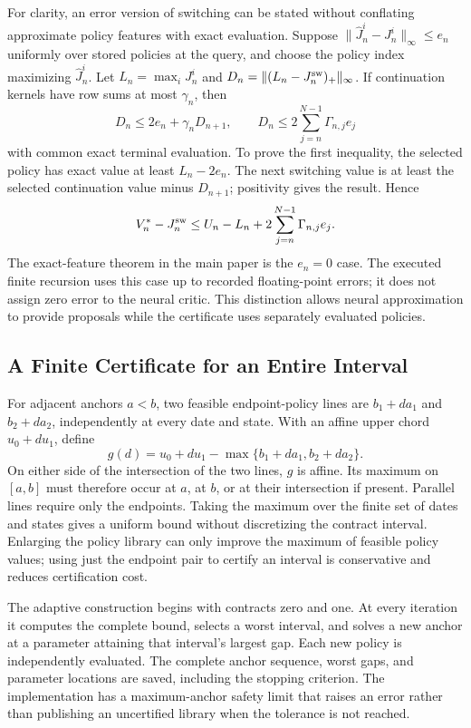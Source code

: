 For clarity, an error version of switching can be stated without conflating approximate policy features with exact evaluation. Suppose $\|\widehat J^i_n-J^i_n\|_\infty\leq e_n$ uniformly over stored policies at the query, and choose the policy index maximizing $\widehat J^i_n$. Let $L_n=\max_iJ^i_n$ and $D_n=\|(L_n-J_n^{\rm sw})_+\|_\infty$. If continuation kernels have row sums at most $\gamma_n$, then
\begin{equation}
 D_n\leq 2e_n+\gamma_nD_{n+1},\qquad
 D_n\leq2\sum_{j=n}^{N-1}\Gamma_{n,j}e_j
 \label{eq:supp_switch_error}
\end{equation}
with common exact terminal evaluation. To prove the first inequality, the selected policy has exact value at least $L_n-2e_n$. The next switching value is at least the selected continuation value minus $D_{n+1}$; positivity gives the result. Hence
\[
 V_n^*-J_n^{\rm sw}\leq U_n-L_n+
 2\sum_{j=n}^{N-1}\Gamma_{n,j}e_j.
\]
The exact-feature theorem in the main paper is the $e_n=0$ case. The executed finite recursion uses this case up to recorded floating-point errors; it does not assign zero error to the neural critic. This distinction allows neural approximation to provide proposals while the certificate uses separately evaluated policies.

\subsection{A Finite Certificate for an Entire Interval}
For adjacent anchors $a<b$, two feasible endpoint-policy lines are $b_1+d a_1$ and $b_2+d a_2$, independently at every date and state. With an affine upper chord $u_0+d u_1$, define
\[
 g(d)=u_0+d u_1-\max\{b_1+d a_1,b_2+d a_2\}.
\]
On either side of the intersection of the two lines, $g$ is affine. Its maximum on $[a,b]$ must therefore occur at $a$, at $b$, or at their intersection if present. Parallel lines require only the endpoints. Taking the maximum over the finite set of dates and states gives a uniform bound without discretizing the contract interval. Enlarging the policy library can only improve the maximum of feasible policy values; using just the endpoint pair to certify an interval is conservative and reduces certification cost.

The adaptive construction begins with contracts zero and one. At every iteration it computes the complete bound, selects a worst interval, and solves a new anchor at a parameter attaining that interval's largest gap. Each new policy is independently evaluated. The complete anchor sequence, worst gaps, and parameter locations are saved, including the stopping criterion. The implementation has a maximum-anchor safety limit that raises an error rather than publishing an uncertified library when the tolerance is not reached.

